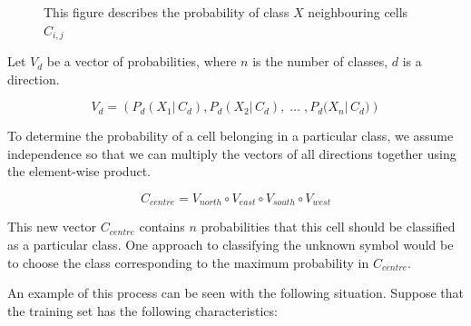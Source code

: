 \documentclass[preprint,3p,12pt]{elsarticle}
\begin{document}
\begin{figure}[h]
\begin{center}
\end{center}
\caption{This figure describes the probability of class $X$ neighbouring cells $C_{i,j}$}
\end{figure}


Let $V_{d}$ be a vector of probabilities, where $n$ is the number of classes,
$d$ is a direction.

\begin{equation}
V_{d} = \left(P_{d}{(X_{1} | \, C_{d})}, P_{d}{(X_{2} | \, C_{d}),\; \ldots \; , P_{d}{(X_{n} | \, C_{d}})}\right)
\end{equation}

To determine the probability of a cell belonging in a particular class, we assume independence
so that we can multiply the vectors of all directions together using the element-wise product.

\begin{equation}
C_{centre} = V_{north} \circ V_{east} \circ V_{south} \circ V_{west}
\end{equation}

This new vector $C_{centre}$ contains $n$ probabilities that this cell should be
classified as a particular class. One approach to classifying the unknown symbol
would be to choose the class corresponding to the maximum probability in $C_{centre}$.

An example of this process can be seen with the following situation. Suppose
that the training set has the following characteristics:
\end{document}

